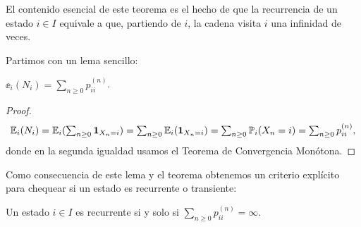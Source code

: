 
El contenido esencial de este teorema es el hecho de que la recurrencia de un estado $i\in I$ equivale a que, partiendo de $i$, la cadena visita $i$ una infinidad de veces.

Partimos con un lema sencillo:

\begin{lem}
$\ee_i(N_i)=\sum_{n\geq0}p_{ii}^{(n)}$.
\end{lem}

\begin{proof}
\[\textstyle\mathbb{E}_i(N_i)=\mathbb{E}_i(\sum_{n\geq0}\mathbf{1}_{X_n=i})=\sum_{n\geq0}\mathbb{E}_i(\mathbf{1}_{X_n=i})=\sum_{n\geq0}\mathbb{P}_i(X_n=i)=\sum_{n\geq0}p_{ii}^{(n)},\]
donde en la segunda igualdad usamos el Teorema de Convergencia Monótona.
\end{proof}

Como consecuencia de este lema y el teorema obtenemos un criterio explícito para chequear si un estado es recurrente o transiente:

\begin{cor}
Un estado $i\in I$ es recurrente si y solo si $\sum_{n\geq0}p_{ii}^{(n)}=\infty$.
\end{cor}

